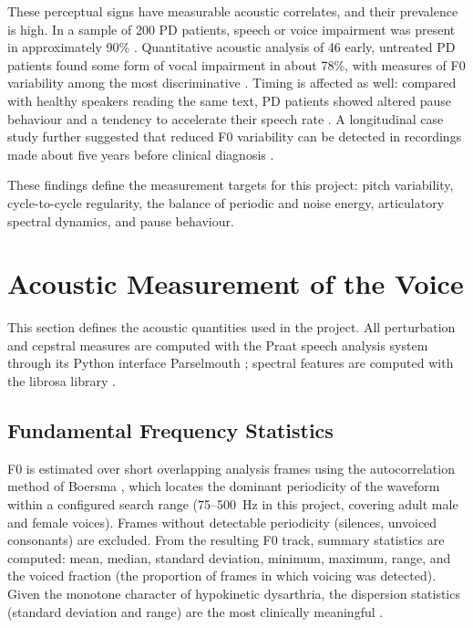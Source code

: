 These perceptual signs have measurable acoustic correlates, and their
prevalence is high. In a sample of 200 PD patients, speech or voice
impairment was present in approximately 90\% \cite{ho1999}.
Quantitative acoustic analysis of 46 early, untreated PD patients found
some form of vocal impairment in about 78\%, with measures of F0
variability among the most discriminative \cite{rusz2011}. Timing is
affected as well: compared with healthy speakers reading the same text,
PD patients showed altered pause behaviour and a tendency to accelerate
their speech rate \cite{skodda2008}. A longitudinal case study further
suggested that reduced F0 variability can be detected in recordings
made about five years before clinical diagnosis \cite{harel2004}.

These findings define the measurement targets for this project: pitch
variability, cycle-to-cycle regularity, the balance of periodic and
noise energy, articulatory spectral dynamics, and pause behaviour.

\section{Acoustic Measurement of the Voice}

This section defines the acoustic quantities used in the project. All
perturbation and cepstral measures are computed with the Praat speech
analysis system \cite{boersma2001} through its Python interface
Parselmouth \cite{jadoul2018}; spectral features are computed with the
librosa library \cite{mcfee2015}.

\subsection{Fundamental Frequency Statistics}

F0 is estimated over short overlapping analysis frames using the
autocorrelation method of Boersma \cite{boersma1993}, which locates the
dominant periodicity of the waveform within a configured search range
(75--500~Hz in this project, covering adult male and female voices).
Frames without detectable periodicity (silences, unvoiced consonants)
are excluded. From the resulting F0 track, summary statistics are
computed: mean, median, standard deviation, minimum, maximum, range,
and the voiced fraction (the proportion of frames in which voicing was
detected). Given the monotone character of hypokinetic dysarthria, the
dispersion statistics (standard deviation and range) are the most
clinically meaningful \cite{rusz2011,harel2004}.

